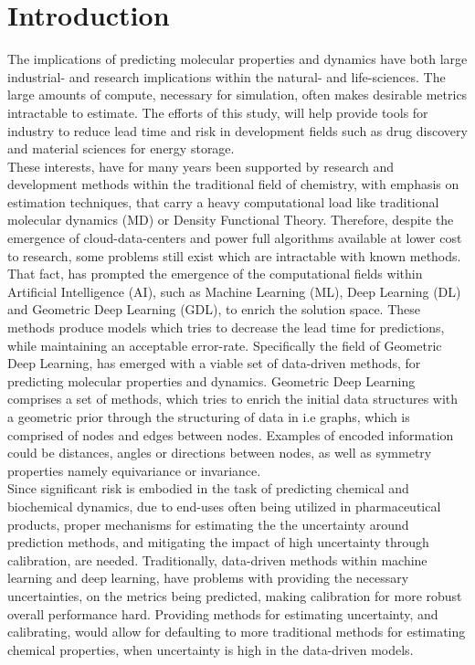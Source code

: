 \section{Introduction}\label{sec:intro}

The implications of predicting molecular properties and dynamics have both large industrial- and research implications within
the natural- and life-sciences. The large amounts of compute, necessary for simulation, often makes desirable metrics intractable
to estimate. The efforts of this study, will help provide tools for industry to reduce lead time and risk in development fields
such as drug discovery and material sciences for energy storage\cite{Busk2021}.  \\

These interests, have for many years been supported by research and development methods within
the traditional field of chemistry, with emphasis on estimation techniques, that carry a heavy computational load like traditional
molecular dynamics (MD)\cite{Behler2011} or Density Functional Theory\cite{Busk2021}. Therefore, despite the emergence of
cloud-data-centers and power full algorithms available at lower cost to research, some problems still exist which are intractable
with known methods.\\

That fact, has prompted the emergence of the computational fields within Artificial Intelligence (AI), such as Machine Learning (ML),
Deep Learning (DL) and Geometric Deep Learning (GDL), to enrich the solution space. These methods produce models which tries to
decrease the lead time for predictions, while maintaining an acceptable error-rate\cite{Gasteiger2020}. Specifically the field
of Geometric Deep Learning, has emerged with a viable set of data-driven methods, for predicting molecular properties and
dynamics\cite{Atz2021}. Geometric Deep Learning comprises a set of methods, which tries to enrich the initial data structures
with a geometric prior through the structuring of data in i.e graphs, which is comprised of nodes and edges
between nodes\cite{Atz2021}. Examples of encoded information could be distances, angles or directions between nodes,
as well as symmetry properties namely equivariance or invariance.\\

Since significant risk is embodied in the task of predicting chemical and biochemical dynamics, due to end-uses often being
utilized in pharmaceutical products, proper mechanisms for estimating the the uncertainty around prediction methods, and
mitigating the impact of high uncertainty through calibration, are needed. Traditionally, data-driven methods within machine
learning and deep learning, have problems with providing the necessary uncertainties, on the metrics being predicted, making
calibration for more robust overall performance hard\cite{Song2019}\cite{Busk2021}\cite{AleatoricAndEpistemic}.
Providing methods for estimating uncertainty, and calibrating, would allow for defaulting to more traditional methods
for estimating chemical properties, when uncertainty is high in the data-driven models\cite{Busk2021}. \\

